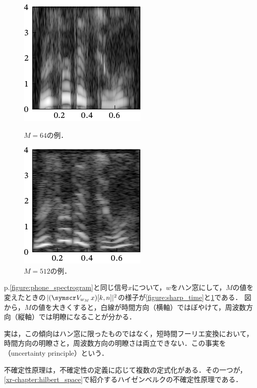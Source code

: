 \documentclass[../../main]{subfiles}
\begin{document}
\begin{figure}[htbp]
  \begin{minipage}{\linewidth/2}
    \centering
    \includegraphics{figures/sharp_time.pdf}
    \caption{\(M=64\)の例．}
    \label{figure:sharp_time}
  \end{minipage}%
  \begin{minipage}{\linewidth/2}
    \centering
    \includegraphics{figures/sharp_frequency.pdf}
    \caption{\(M=512\)の例．}
    \label{figure:sharp_frequency}
  \end{minipage}
\end{figure}

p.\pageref{figure:phone_spectrogram}\cref{figure:phone_spectrogram}と同じ信号\(x\)について，\(w\)をハン窓にして，\(M\)の値を変えたときの\(\abs{(\stft{w_M}x)[k,n]}^2\)の様子が\cref{figure:sharp_time}と\cref{figure:sharp_frequency}である．
図から，\(M\)の値を大きくすると，白線が時間方向（横軸）ではぼやけて，周波数方向（縦軸）では明瞭になることが分かる．

実は，この傾向はハン窓に限ったものではなく，短時間フーリエ変換において，時間方向の明瞭さと，周波数方向の明瞭さは両立できない．この事実を（uncertainty principle）という．

\begin{note}
  不確定性原理は，不確定性の定義に応じて複数の定式化がある．その一つが，\cref{xr-chapter:hilbert_space}で紹介するハイゼンベルクの不確定性原理である．
\end{note}
\end{document}

